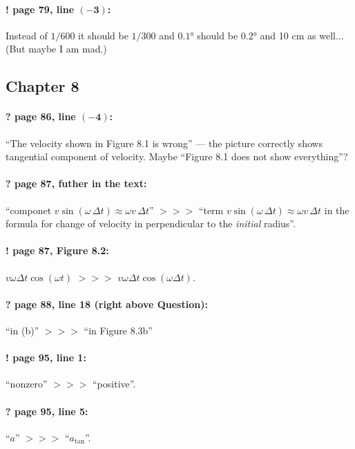 \documentclass[twoside]{article}
\begin{document}
\paragraph{! page 79, line $\bm{(-3)}$:} Instead of $1/600$ it should be $1/300$ and $0{.}1$° should be $0{.}2$° and 10 cm as well... (But maybe I am mad.)

\subsection*{Chapter 8}

\paragraph{? page 86, line $\bm{(-4)}$:} ``The velocity shown in Figure 8.1 is wrong'' --- the picture correctly shows tangential component of velocity. Maybe ``Figure 8.1 does not show everything''?

\paragraph{? page 87, futher in the text:} ``componet $v \sin(\omega \,\Delta t) \approx \omega v \,\Delta t$'' $>\!>\!>$ ``term $v \sin(\omega \,\Delta t) \approx \omega v \,\Delta t$ in the formula for change of velocity in perpendicular to the \emph{initial} radius''.

\paragraph{! page 87, Figure 8.2:} $v\omega\Delta t\cos(\omega t)$ $>\!>\!>$ $v\omega\Delta t\cos(\omega \Delta t)$.

\paragraph{? page 88, line 18 (right above Question):} ``in (b)'' $>\!>\!>$ ``in Figure 8.3b''

\paragraph{! page 95, line 1:} ``nonzero'' $>\!>\!>$ ``positive''.

\paragraph{? page 95, line 5:} ``$a$'' $>\!>\!>$ ``$a_{\mathrm{tan}}$''.
\end{document}
